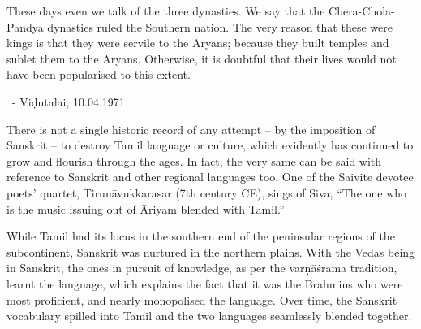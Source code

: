 \begin{myquote}
These days even we talk of the three dynasties. We say that the Chera-Chola-Pandya dynasties ruled the Southern nation. The very reason that these were kings is that they were servile to the Aryans; because they built temples and sublet them to the Aryans. Otherwise, it is doubtful that their lives would not have been popularised to this extent.

~\hfill - Viḍutalai, 10.04.1971
\end{myquote}

There is not a single historic record of any attempt – by the imposition of Sanskrit – to destroy Tamil language or culture, which evidently has continued to grow and flourish through the ages. In fact, the very same can be said with reference to Sanskrit and other regional languages too. One of the Saivite devotee poets’ quartet, Tirunāvukkarasar (7th century CE), sings of Siva, “The one who is the music issuing out of Āriyam blended with Tamil.”

While Tamil had its locus in the southern end of the peninsular regions of the subcontinent, Sanskrit was nurtured in the northern plains. With the Vedas being in Sanskrit, the ones in pursuit of knowledge, as per the varṇāśrama tradition, learnt the language, which explains the fact that it was the Brahmins who were most proficient, and nearly monopolised the language. Over time, the Sanskrit vocabulary spilled into Tamil and the two languages seamlessly blended together.


